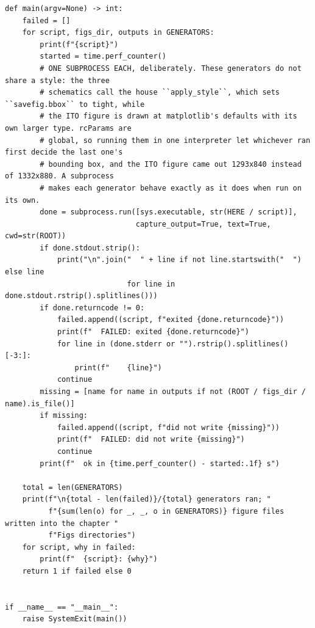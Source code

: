 \documentclass[a4paper,10pt]{article}
\begin{document}
\begin{Verbatim}
def main(argv=None) -> int:
    failed = []
    for script, figs_dir, outputs in GENERATORS:
        print(f"{script}")
        started = time.perf_counter()
        # ONE SUBPROCESS EACH, deliberately. These generators do not share a style: the three
        # schematics call the house ``apply_style``, which sets ``savefig.bbox`` to tight, while
        # the ITO figure is drawn at matplotlib's defaults with its own larger type. rcParams are
        # global, so running them in one interpreter let whichever ran first decide the last one's
        # bounding box, and the ITO figure came out 1293x840 instead of 1332x880. A subprocess
        # makes each generator behave exactly as it does when run on its own.
        done = subprocess.run([sys.executable, str(HERE / script)],
                              capture_output=True, text=True, cwd=str(ROOT))
        if done.stdout.strip():
            print("\n".join("  " + line if not line.startswith("  ") else line
                            for line in done.stdout.rstrip().splitlines()))
        if done.returncode != 0:
            failed.append((script, f"exited {done.returncode}"))
            print(f"  FAILED: exited {done.returncode}")
            for line in (done.stderr or "").rstrip().splitlines()[-3:]:
                print(f"    {line}")
            continue
        missing = [name for name in outputs if not (ROOT / figs_dir / name).is_file()]
        if missing:
            failed.append((script, f"did not write {missing}"))
            print(f"  FAILED: did not write {missing}")
            continue
        print(f"  ok in {time.perf_counter() - started:.1f} s")

    total = len(GENERATORS)
    print(f"\n{total - len(failed)}/{total} generators ran; "
          f"{sum(len(o) for _, _, o in GENERATORS)} figure files written into the chapter "
          f"Figs directories")
    for script, why in failed:
        print(f"  {script}: {why}")
    return 1 if failed else 0


if __name__ == "__main__":
    raise SystemExit(main())
\end{Verbatim}
\end{document}
